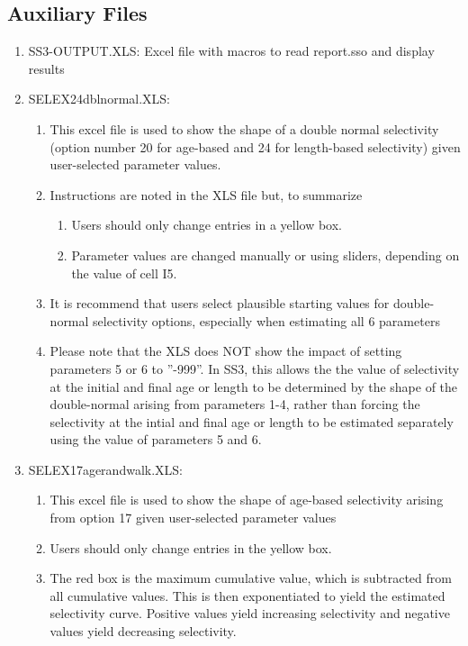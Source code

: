 	
	\subsection{Auxiliary Files}
	\begin{enumerate}
		\item SS3-OUTPUT.XLS:   Excel file with macros to read report.sso and display results
		\item SELEX24\textunderscore dbl\textunderscore normal.XLS:
		\begin{enumerate}
			\item This excel file is used to show the shape of a double normal selectivity (option number 20 for age-based and 24 for length-based selectivity) given user-selected parameter values.
			\item Instructions are noted in the XLS file but, to summarize
			\begin{enumerate}
				\item Users should only change entries in a yellow box. 
				\item Parameter values are changed manually or using sliders, depending on the value of cell I5.
			\end{enumerate}
			\item It is recommend that users select plausible starting values for double-normal selectivity options, especially when estimating all 6 parameters
			\item Please note that the XLS does NOT show the impact of setting parameters 5 or 6 to ''-999''.  In SS3, this allows the the value of selectivity at the initial and final age or length to be determined by the shape of the double-normal arising from parameters 1-4, rather than forcing the selectivity at the intial and final age or length to be estimated separately using the value of parameters 5 and 6. 
		\end{enumerate}
		\item SELEX17\textunderscore age\textunderscore randwalk.XLS:
		\begin{enumerate}
			\item This excel file is used to show the shape of age-based selectivity arising from option 17 given user-selected parameter values
			\item Users should only change entries in the yellow box.
			\item The red box is the maximum cumulative value, which is subtracted from all cumulative values.  This is then exponentiated to yield the estimated selectivity curve.  Positive values yield increasing selectivity and negative values yield decreasing selectivity.

\end{enumerate}
\end{enumerate}
